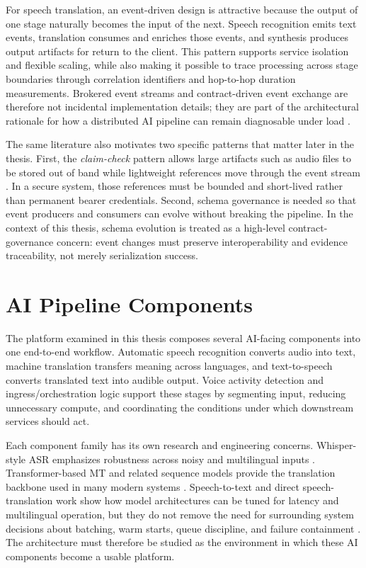 For speech translation, an event-driven design is attractive because the output of one stage naturally becomes the input of the next. Speech recognition emits text events, translation consumes and enriches those events, and synthesis produces output artifacts for return to the client. This pattern supports service isolation and flexible scaling, while also making it possible to trace processing across stage boundaries through correlation identifiers and hop-to-hop duration measurements. Brokered event streams and contract-driven event exchange are therefore not incidental implementation details; they are part of the architectural rationale for how a distributed AI pipeline can remain diagnosable under load \cite{kleppmann2017designing,richardson2018microservices}.

The same literature also motivates two specific patterns that matter later in the thesis. First, the \emph{claim-check} pattern allows large artifacts such as audio files to be stored out of band while lightweight references move through the event stream \cite{hohpe2004enterprise}. In a secure system, those references must be bounded and short-lived rather than permanent bearer credentials. Second, schema governance is needed so that event producers and consumers can evolve without breaking the pipeline. In the context of this thesis, schema evolution is treated as a high-level contract-governance concern: event changes must preserve interoperability and evidence traceability, not merely serialization success.

\section{AI Pipeline Components}
\label{sec:ai_pipeline_components}

The platform examined in this thesis composes several AI-facing components into one end-to-end workflow. Automatic speech recognition converts audio into text, machine translation transfers meaning across languages, and text-to-speech converts translated text into audible output. Voice activity detection and ingress/orchestration logic support these stages by segmenting input, reducing unnecessary compute, and coordinating the conditions under which downstream services should act.

Each component family has its own research and engineering concerns. Whisper-style ASR emphasizes robustness across noisy and multilingual inputs \cite{radford2022whisper}. Transformer-based MT and related sequence models provide the translation backbone used in many modern systems \cite{bahdanau2014neural,vaswani2017attention}. Speech-to-text and direct speech-translation work show how model architectures can be tuned for latency and multilingual operation, but they do not remove the need for surrounding system decisions about batching, warm starts, queue discipline, and failure containment \cite{wang2020fairseq,inaguma2023unity,zhang2024direct}. The architecture must therefore be studied as the environment in which these AI components become a usable platform.

